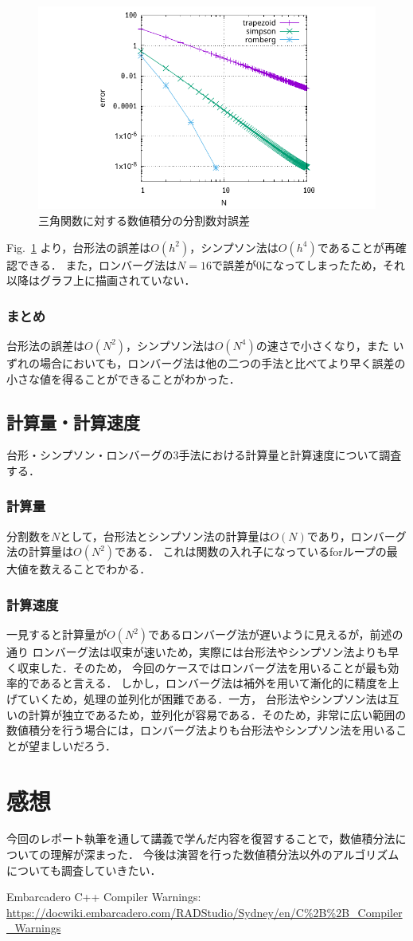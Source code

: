 \documentclass[gutter=20mm,fore-edge=20mm,head_space=30mm,foot_space=30mm]{jlreq}
\begin{document}
\begin{figure}[H]
  \centering
  \includegraphics[width=0.8\linewidth]{3/sin/sin.pdf}
  \caption{三角関数に対する数値積分の分割数対誤差}
  \label{fig:sin}
\end{figure}

Fig.~\ref{fig:sin} より，台形法の誤差は$O(h^2)$，シンプソン法は$O(h^4)$であることが再確認できる．
また，ロンバーグ法は$N=16$で誤差が0になってしまったため，それ以降はグラフ上に描画されていない．

\subsubsection{まとめ}
台形法の誤差は$O(N^2)$，シンプソン法は$O(N^4)$の速さで小さくなり，また
いずれの場合においても，ロンバーグ法は他の二つの手法と比べてより早く誤差の小さな値を得ることができることがわかった．

\subsection{計算量・計算速度}
台形・シンプソン・ロンバーグの3手法における計算量と計算速度について調査する．

\subsubsection{計算量}
分割数を$N$として，台形法とシンプソン法の計算量は$O(N)$であり，ロンバーグ法の計算量は$O(N^2)$である．
これは関数の入れ子になっているforループの最大値を数えることでわかる．

\subsubsection{計算速度}
一見すると計算量が$O(N^2)$であるロンバーグ法が遅いように見えるが，前述の通り
ロンバーグ法は収束が速いため，実際には台形法やシンプソン法よりも早く収束した．そのため，
今回のケースではロンバーグ法を用いることが最も効率的であると言える．
しかし，ロンバーグ法は補外を用いて漸化的に精度を上げていくため，処理の並列化が困難である．一方，
台形法やシンプソン法は互いの計算が独立であるため，並列化が容易である．そのため，非常に広い範囲の
数値積分を行う場合には，ロンバーグ法よりも台形法やシンプソン法を用いることが望ましいだろう．

\section{感想}
今回のレポート執筆を通して講義で学んだ内容を復習することで，数値積分法についての理解が深まった．
今後は演習を行った数値積分法以外のアルゴリズムについても調査していきたい．

\begin{thebibliography}{99}
 Embarcadero C++ Compiler Warnings: \url{https://docwiki.embarcadero.com/RADStudio/Sydney/en/C%2B%2B_Compiler_Warnings}
\end{thebibliography}
\end{document}
